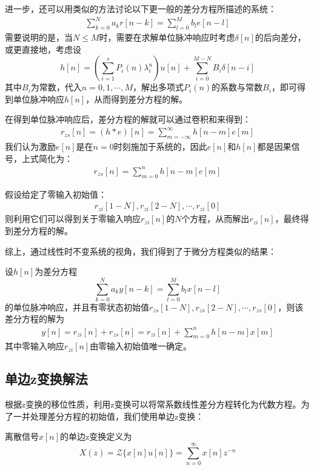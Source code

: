 进一步，还可以用类似的方法讨论以下更一般的差分方程所描述的系统：
\begin{align*}
    \sum_{k=0}^{N}a_k r[n-k] = \sum_{l=0}^{M}b_l e[n-l]
\end{align*}
需要说明的是，当$N\leq M$时，需要在求解单位脉冲响应时考虑$\delta[n]$的后向差分，或更直接地，考虑设
$$h[n]=\left(\sum_{i=1}^s P_i(n) \lambda_i^n \right)u[n]+\sum_{i=0}^{M-N}B_i\delta[n-i]$$
其中$B_i$为常数，代入$n=0,1,\cdots,M$，解出多项式$P_i(n)$的系数与常数$B_i$，即可得到单位脉冲响应$h[n]$，从而得到差分方程的解。

在得到单位脉冲响应后，差分方程的解就可以通过卷积和来得到：
\begin{align*}
    r_{zs}[n]=(h*e)[n]=\sum_{m=-\infty}^{\infty}h[n-m]e[m]
\end{align*}
我们认为激励$e[n]$是在$n=0$时刻施加于系统的，因此$e[n]$和$h[n]$都是因果信号，上式简化为：
\begin{align*}
    r_{zs}[n]=\sum_{m=0}^{n}h[n-m]e[m]
\end{align*}

假设给定了零输入初始值：
\begin{align*}
    r_{zi}[1-N],r_{zi}[2-N],\cdots,r_{zi}[0]
\end{align*}
则利用它们可以得到关于零输入响应$r_{zi}[n]$的$N$个方程，从而解出$r_{zi}[n]$，最终得到差分方程的解。

综上，通过线性时不变系统的视角，我们得到了于微分方程类似的结果：
\begin{theorem}
    设$h[n]$为差分方程
    $$\sum_{k=0}^{N}a_k y[n-k] = \sum_{l=0}^{M}b_l x[n-l]$$
    的单位脉冲响应，并且有零状态初始值$r_{zs}[1-N],r_{zs}[2-N],\cdots,r_{zs}[0]$，则该差分方程的解为
    \begin{align*}
        y[n]=r_{zi}[n]+r_{zs}[n]=r_{zi}[n]+\sum_{m=0}^{n}h[n-m]x[m]
    \end{align*}
    其中零输入响应$r_{zi}[n]$由零输入初始值唯一确定。
\end{theorem}

\subsection{单边z变换解法}\label{sub:single_z}

根据z变换的移位性质，利用z变换可以将常系数线性差分方程转化为代数方程。为了一并处理差分方程的初始值，我们使用单边z变换：
\begin{definition}[单边z变换]
    离散信号$x[n]$的单边z变换定义为
    \[X(z)=\mathcal{Z}\{x[n]u[n]\}=\sum_{n=0}^{\infty}x[n]z^{-n}\]
\end{definition}

